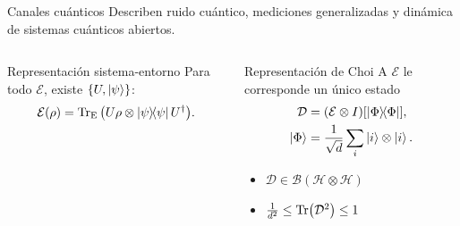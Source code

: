 \documentclass[10pt,handout]{beamer}
\begin{document}
\begin{frame}{Canales cuánticos}
Describen ruido cuántico, mediciones generalizadas y \alert{dinámica de 
sistemas cuánticos abiertos}. 

\begin{columns}[t,onlytextwidth]
\begin{alertblock}{Representación sistema-entorno}
Para todo $\mathcal{E}$, existe $\{U, \ket{\psi}\}$:
\[
\mathcal{E}(\rho) 
=
\Tr_\mathrm{E}
\qty(
U 
\rho \otimes \dyad{\psi}
U^\dagger
).
\]
%
\begin{center}
\end{center}
\end{alertblock}

\begin{alertblock}{Representación de Choi}
A $\mathcal E$ le corresponde un único \alert{estado}
\[\begin{aligned}
\mathcal{D} &= 
\qty(\mathcal{E} \otimes I )
\qty[\dyad{\Phi}],\\
\ket{\Phi} &= 
\frac{1}{\sqrt{d}}
\sum_i \ket{i}\otimes \ket{i}.
\end{aligned}\]

\begin{itemize}
\item $\mathcal{D} \in \mathcal{B}(\mathcal H \otimes \mathcal H)$
\item $\frac{1}{d^2} \leq \Tr(\mathcal{D}^2) \leq 1$
\end{itemize}
\end{alertblock}
\end{columns}

\end{frame}
\end{document}
